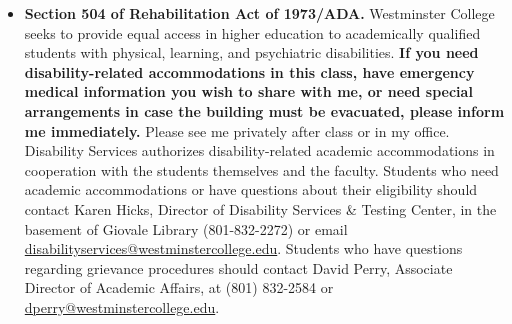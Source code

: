 \documentclass[11pt, a4paper]{article}
\begin{document}
\begin{itemize}

\item \textbf{Section 504 of Rehabilitation Act of 1973/ADA.} Westminster College seeks to provide equal access in higher education to academically qualified students with physical, learning, and psychiatric disabilities. \textbf{If you need disability-related accommodations in this class, have emergency medical information you wish to share with me, or need special arrangements in case the building must be evacuated, please inform me immediately.} Please see me privately after class or in my office. Disability Services authorizes disability-related academic accommodations in cooperation with the students themselves and the faculty. Students who need academic accommodations or have questions about their eligibility should contact Karen Hicks, Director of Disability Services \& Testing Center, in the basement of Giovale Library (801-832-2272) or email \href{mailto:disabilityservices@westminstercollege.edu}{disabilityservices@westminstercollege.edu}. Students who have questions regarding grievance procedures should contact David Perry, Associate Director of Academic Affairs, at (801) 832-2584 or \href{mailto:dperry@westminstercollege.edu}{dperry@westminstercollege.edu}.

\end{itemize}
\end{document}
